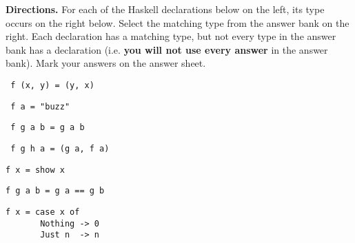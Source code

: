 \documentclass[12pt]{article}
\begin{document}
\begin{enumerate}
%
%
%
%
%
%


\newpage

\item[] {\bf Directions.}
For each of the Haskell declarations  below on the left,
its type occurs on the right below. Select the matching type from the answer bank on the right.
Each declaration has a matching type, but not every type in the answer bank has a declaration (i.e.
{\bf you will not use every answer} in the answer bank). Mark your answers on the answer sheet.

\vspace{4ex}

\begin{minipage}{2.5in}
\item \begin{verbatim} f (x, y) = (y, x) \end{verbatim}

\item \begin{verbatim} f a = "buzz" \end{verbatim}

\item \begin{verbatim} f g a b = g a b \end{verbatim}

\item \begin{verbatim} f g h a = (g a, f a) \end{verbatim}

\item \begin{verbatim}
f x = show x
\end{verbatim}

\item \begin{verbatim}
f g a b = g a == g b
\end{verbatim}

\item \begin{verbatim} 
f x = case x of 
       Nothing -> 0
       Just n  -> n
\end{verbatim}


\end{minipage}
\end{enumerate}
\end{document}

